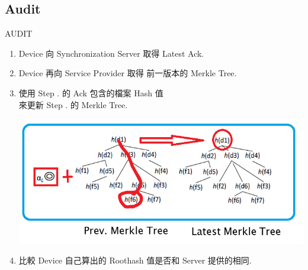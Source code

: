\documentclass{beamer}
\newcommand{\RNum}[1]{\uppercase\expandafter{\romannumeral #1\relax}}
\begin{document}
\begin{CJK}{UTF8}{bkai}
\subsection{Audit}
\begin{frame}{AUDIT}
	\begin{enumerate}
		\item Device 向 \alert{Synchronization Server} 取得 Latest Ack.
		\item Device 再向 \alert{Service Provider} 取得 前一版本的 Merkle Tree.
		\item 使用 Step \RNum{1}. 的 Ack 包含的檔案 Hash 值\\
			  來更新 Step \RNum{2}. 的 Merkle Tree.
			  \begin{center}
			  \includegraphics[width=.7\textwidth]{auditing.png}
			  \end{center}
		\item 比較 Device 自己算出的 Roothash 值是否和 Server 提供的相同.
	\end{enumerate}
\end{frame}


\end{CJK}
\end{document}
